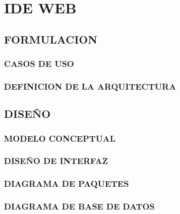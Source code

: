 \section{IDE WEB}
\subsection{FORMULACION}
\subsubsection{CASOS DE USO}
\subsubsection{DEFINICION DE LA ARQUITECTURA}
\subsection{DISEÑO}
\subsubsection{MODELO CONCEPTUAL}
\subsubsection{DISEÑO DE INTERFAZ}
\subsubsection{DIAGRAMA DE PAQUETES}
\subsubsection{DIAGRAMA DE BASE DE DATOS}
